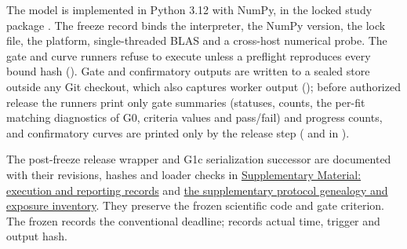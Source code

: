 The model is implemented in Python 3.12 with NumPy, in the locked study package . The freeze record binds the interpreter, the NumPy version, the lock file, the platform, single-threaded BLAS and a cross-host numerical probe. The gate and curve runners refuse to execute unless a preflight reproduces every bound hash (). Gate and confirmatory outputs are written to a sealed store outside any Git checkout, which also captures worker output (); before authorized release the runners print only gate summaries (statuses, counts, the per-fit matching diagnostics of G0, criteria values and pass/fail) and progress counts, and confirmatory curves are printed only by the release step ( and  in ).

The post-freeze release wrapper and G1c serialization successor are documented with their revisions, hashes and loader checks in \hyperref[supp:execution-records]{Supplementary Material: execution and reporting records} and \hyperref[supp:protocol-lineage]{the supplementary protocol genealogy and exposure inventory}. They preserve the frozen scientific code and gate criterion. The frozen  records the conventional deadline;  records actual time, trigger and output hash.
